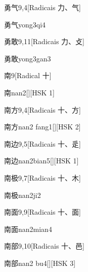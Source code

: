 \begin{entry}{勇气}{9,4}[Radicais ⼒、⽓]
  \begin{phonetics}{勇气}{yong3qi4}
  \end{phonetics}
\end{entry}

\begin{entry}{勇敢}{9,11}[Radicais ⼒、⽁]
  \begin{phonetics}{勇敢}{yong3gan3}
  \end{phonetics}
\end{entry}

\begin{entry}{南}{9}[Radical ⼗]
  \begin{phonetics}{南}{nan2}[][HSK 1]
  \end{phonetics}
\end{entry}

\begin{entry}{南方}{9,4}[Radicais ⼗、⽅]
  \begin{phonetics}{南方}{nan2 fang1}[][HSK 2]
  \end{phonetics}
\end{entry}

\begin{entry}{南边}{9,5}[Radicais ⼗、⾡]
  \begin{phonetics}{南边}{nan2bian5}[][HSK 1]
  \end{phonetics}
\end{entry}

\begin{entry}{南极}{9,7}[Radicais ⼗、⽊]
  \begin{phonetics}{南极}{nan2ji2}
  \end{phonetics}
\end{entry}

\begin{entry}{南面}{9,9}[Radicais ⼗、⾯]
  \begin{phonetics}{南面}{nan2mian4}
  \end{phonetics}
\end{entry}

\begin{entry}{南部}{9,10}[Radicais ⼗、⾢]
  \begin{phonetics}{南部}{nan2 bu4}[][HSK 3]
  \end{phonetics}
\end{entry}

